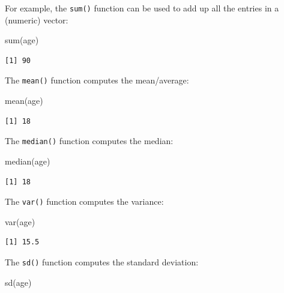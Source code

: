 \documentclass[
  letterpaper,
  DIV=11,
  numbers=noendperiod]{scrreprt}
\newenvironment{Shaded}{\begin{snugshade}}{\end{snugshade}}
\newcommand{\FunctionTok}[1]{\textcolor[rgb]{0.28,0.35,0.67}{#1}}
\newcommand{\NormalTok}[1]{\textcolor[rgb]{0.00,0.23,0.31}{#1}}
\begin{document}
For example, the \texttt{sum()} function can be used to add up all the
entries in a (numeric) vector:

\begin{Shaded}
\begin{Highlighting}[]
\FunctionTok{sum}\NormalTok{(age)}
\end{Highlighting}
\end{Shaded}

\begin{verbatim}
[1] 90
\end{verbatim}

The \texttt{mean()} function computes the mean/average:

\begin{Shaded}
\begin{Highlighting}[]
\FunctionTok{mean}\NormalTok{(age)}
\end{Highlighting}
\end{Shaded}

\begin{verbatim}
[1] 18
\end{verbatim}

The \texttt{median()} function computes the median:

\begin{Shaded}
\begin{Highlighting}[]
\FunctionTok{median}\NormalTok{(age)}
\end{Highlighting}
\end{Shaded}

\begin{verbatim}
[1] 18
\end{verbatim}

The \texttt{var()} function computes the variance:

\begin{Shaded}
\begin{Highlighting}[]
\FunctionTok{var}\NormalTok{(age)}
\end{Highlighting}
\end{Shaded}

\begin{verbatim}
[1] 15.5
\end{verbatim}

The \texttt{sd()} function computes the standard deviation:

\begin{Shaded}
\begin{Highlighting}[]
\FunctionTok{sd}\NormalTok{(age)}
\end{Highlighting}
\end{Shaded}
\end{document}
